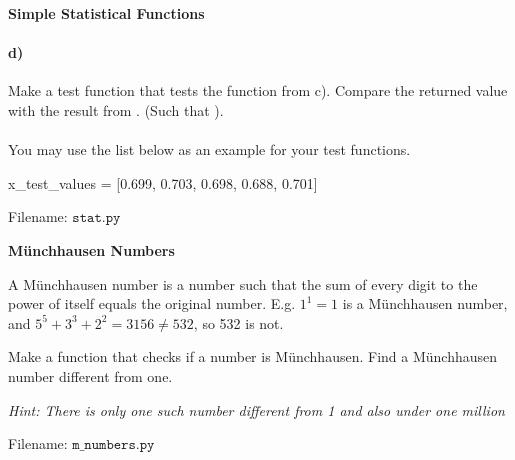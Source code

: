 \begin{Problem}{\textbf{Simple Statistical Functions}}
\paragraph{d)} Make a test function  that tests the function from c). Compare the returned value with the result from 
. (Such that ).
 
\paragraph{} You may use the list below as an example for your test functions.
\begin{python}
x_test_values = [0.699, 0.703, 0.698, 0.688, 0.701]
\end{python}

Filename: $\texttt{stat.py}$  
\end{Problem}

\begin{Problem}{\textbf{Münchhausen Numbers}}

\noindent A Münchhausen number is a number such that the sum of every digit to the power
of itself equals the original number. E.g. $1^1 = 1$ is a Münchhausen number, and
 $5^5 + 3^3 + 2^2 = 3156\neq 532$, so 532 is not.

Make a function that checks if a number is Münchhausen. Find a Münchhausen number different from one.

\emph{Hint: There is only one such number different from 1 and also under one million}

Filename: $\texttt{m\_numbers.py}$
\end{Problem}